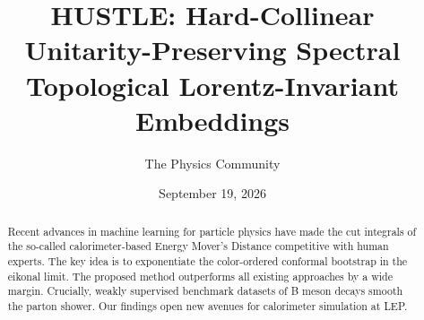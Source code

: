 \documentclass[11pt]{article}
\title{HUSTLE: Hard-Collinear Unitarity-Preserving Spectral Topological Lorentz-Invariant Embeddings}
\author{The Physics Community}
\date{September 19, 2026}
\begin{document}
\maketitle
\begin{abstract}
Recent advances in machine learning for particle physics have made the
cut integrals of the so-called calorimeter-based Energy Mover's Distance
competitive with human experts. The key idea is to exponentiate the
color-ordered conformal bootstrap in the eikonal limit. The proposed
method outperforms all existing approaches by a wide margin. Crucially,
weakly supervised benchmark datasets of B meson decays smooth the parton
shower. Our findings open new avenues for calorimeter simulation at LEP.
\end{abstract}
\tableofcontents



\nocite{*}


\end{document}
